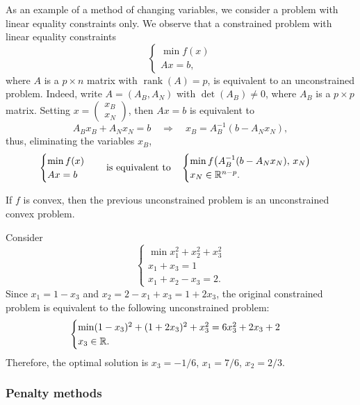 As an example of a method of changing variables, we consider a problem with linear equality constraints only. We observe that a constrained problem with linear equality constraints
\[
\begin{cases}
\min f(x)\\
Ax = b,
\end{cases}
\]
where $A$ is a $p \times n$ matrix with $\operatorname{rank}(A) = p$, is equivalent to an unconstrained problem. Indeed, write $A = (A_B, A_N)$ with $\det(A_B) \neq 0$, where $A_B$ is a $p \times p$ matrix. Setting $x = \begin{pmatrix} x_B\\ x_N \end{pmatrix}$, then $Ax = b$ is equivalent to
\[
A_B x_B + A_N x_N = b \quad\Longrightarrow\quad x_B = A_B^{-1}(b - A_N x_N),
\]
thus, eliminating the variables $x_B$,
\[
\begin{cases}
\min f(x)\\
Ax = b
\end{cases}
\quad\text{is equivalent to}\quad
\begin{cases}
\min f\big(A_B^{-1}(b - A_N x_N),\, x_N\big)\\
x_N \in \mathbb{R}^{n-p}.
\end{cases}
\]

\begin{remark}
If $f$ is convex, then the previous unconstrained problem is an unconstrained convex problem.
\end{remark}

\begin{example}
Consider
\[
\begin{cases}
\min x_1^2 + x_2^2 + x_3^2\\
x_1 + x_3 = 1\\
x_1 + x_2 - x_3 = 2.
\end{cases}
\]
Since $x_1 = 1 - x_3$ and $x_2 = 2 - x_1 + x_3 = 1 + 2x_3$, the original constrained problem is equivalent to the following unconstrained problem:
\[
\begin{cases}
\min (1 - x_3)^2 + (1 + 2x_3)^2 + x_3^2 = 6x_3^2 + 2x_3 + 2\\
x_3 \in \mathbb{R}.
\end{cases}
\]
Therefore, the optimal solution is $x_3 = -1/6$, $x_1 = 7/6$, $x_2 = 2/3$.
\end{example}

\subsubsection{Penalty methods}

